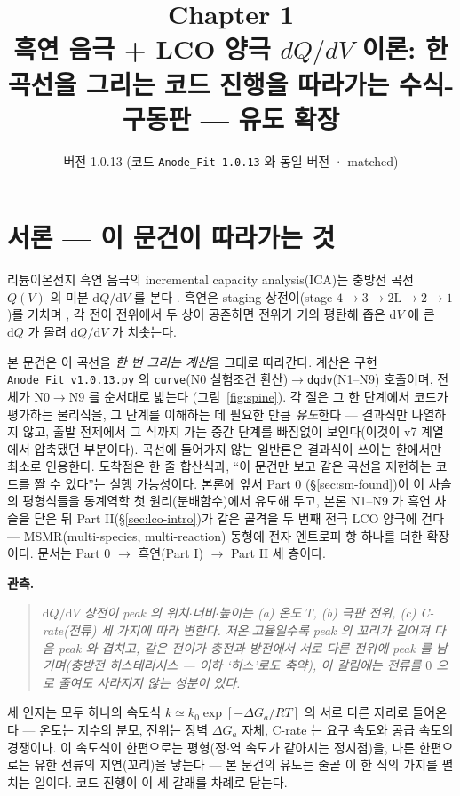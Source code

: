 \documentclass[11pt,a4paper]{article}
\title{\textbf{\LARGE Chapter 1}\\[0.35em]\Large 흑연 음극 + LCO 양극 $dQ/dV$ 이론: 한 곡선을 그리는 코드 진행을 따라가는 수식-구동판 — 유도 확장}
\author{}
\date{\normalsize 버전 1.0.13 \quad(코드 \texttt{Anode\_Fit 1.0.13} 와 동일 버전 · matched)}
\newcommand{\dd}{\mathrm{d}}
\newcommand{\code}[1]{\texttt{#1}}
\begin{document}
\maketitle

\section*{서론 — 이 문건이 따라가는 것}
리튬이온전지 흑연 음극의 incremental capacity analysis(ICA)는 충방전 곡선 $Q(V)$ 의 미분
$\dd Q/\dd V$ 를 본다 \cite{bloom2005,dubarry2012}. 흑연은 staging 상전이(stage
$4\!\to\!3\!\to\!2\mathrm L\!\to\!2\!\to\!1$)를 거치며 \cite{dahn1991,ohzuku1993}, 각 전이 전위에서
두 상이 공존하면 전위가 거의 평탄해 좁은 $\dd V$ 에 큰 $\dd Q$ 가 몰려 $\dd Q/\dd V$ 가 치솟는다.

본 문건은 이 곡선을 \emph{한 번 그리는 계산}을 그대로 따라간다. 계산은 구현 \code{Anode\_Fit\_v1.0.13.py}
의 \code{curve}(N0 실험조건 환산)$\to$\code{dqdv}(N1--N9) 호출이며, 전체가 $\mathrm N0\!\to\!\mathrm N9$ 를 순서대로 밟는다
(그림~\ref{fig:spine}). 각 절은 그 한 단계에서 코드가 평가하는 물리식을, 그 단계를 이해하는 데 필요한 만큼
\emph{유도}한다 — 결과식만 나열하지 않고, 출발 전제에서 그 식까지 가는 중간 단계를 빠짐없이 보인다(이것이 v7
계열에서 압축됐던 부분이다). 곡선에 들어가지 않는 일반론은 결과식이 쓰이는 한에서만 최소로 인용한다. 도착점은 한 줄
합산식과, ``이 문건만 보고 같은 곡선을 재현하는 코드를 짤 수 있다''는 실행 가능성이다. 본론에 앞서 Part 0
(\S\ref{sec:sm-found})이 이 사슬의 평형식들을 통계역학 첫 원리(분배함수)에서 유도해 두고, 본론 N1--N9 가 흑연
사슬을 닫은 뒤 Part II(\S\ref{sec:lco-intro})가 같은 골격을 두 번째 전극 LCO 양극에 건다 — MSMR(multi-species,
multi-reaction) 동형에 전자 엔트로피 항 하나를 더한 확장이다. 문서는 Part 0 $\to$ 흑연(Part I) $\to$ Part II 세 층이다.

\textbf{관측.}
\begin{quote}\itshape
$\dd Q/\dd V$ 상전이 peak 의 위치$\cdot$너비$\cdot$높이는 (a) 온도 $T$, (b) 극판 전위, (c) C-rate(전류)
세 가지에 따라 변한다. 저온$\cdot$고율일수록 peak 의 꼬리가 길어져 다음 peak 와 겹치고, 같은 전이가 충전과 방전에서
서로 다른 전위에 peak 를 남기며(충방전 히스테리시스 — 이하 `히스'로도 축약), 이 갈림에는 전류를 $0$ 으로 줄여도 사라지지 않는 성분이 있다.
\end{quote}

세 인자는 모두 하나의 속도식 $k\simeq k_0\exp[-\Delta G_a/RT]$ 의 서로 다른 자리로 들어온다 — 온도는 지수의 분모,
전위는 장벽 $\Delta G_a$ 자체, C-rate 는 요구 속도와 공급 속도의 경쟁이다. 이 속도식이 한편으로는 평형(정$\cdot$역
속도가 같아지는 정지점)을, 다른 한편으로는 유한 전류의 지연(꼬리)을 낳는다 — 본 문건의 유도는 줄곧 이 한 식의 가지를
펼치는 일이다. 코드 진행이 이 세 갈래를 차례로 닫는다.
\end{document}
